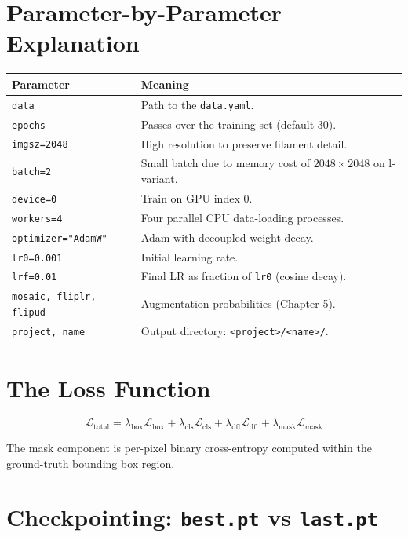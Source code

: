 \documentclass[11pt,a4paper,openany]{report}
\begin{document}
\section{Parameter-by-Parameter Explanation}

\begin{center}
\renewcommand{\arraystretch}{1.3}
\begin{tabular}{l p{9cm}}
\toprule
\textbf{Parameter} & \textbf{Meaning} \\
\midrule
\texttt{data} & Path to the \texttt{data.yaml}. \\
\texttt{epochs} & Passes over the training set (default 30). \\
\texttt{imgsz=2048} & High resolution to preserve filament detail. \\
\texttt{batch=2} & Small batch due to memory cost of $2048\times2048$ on l-variant. \\
\texttt{device=0} & Train on GPU index 0. \\
\texttt{workers=4} & Four parallel CPU data-loading processes. \\
\texttt{optimizer="AdamW"} & Adam with decoupled weight decay. \\
\texttt{lr0=0.001} & Initial learning rate. \\
\texttt{lrf=0.01} & Final LR as fraction of \texttt{lr0} (cosine decay). \\
\texttt{mosaic, fliplr, flipud} & Augmentation probabilities (Chapter 5). \\
\texttt{project, name} & Output directory: \texttt{<project>/<name>/}. \\
\bottomrule
\end{tabular}
\end{center}

\section{The Loss Function}

\[
  \mathcal{L}_\text{total} = \lambda_\text{box}\mathcal{L}_\text{box}
                            + \lambda_\text{cls}\mathcal{L}_\text{cls}
                            + \lambda_\text{dfl}\mathcal{L}_\text{dfl}
                            + \lambda_\text{mask}\mathcal{L}_\text{mask}
\]

The mask component is per-pixel binary cross-entropy computed within the ground-truth
bounding box region.

\section{Checkpointing: \texttt{best.pt} vs \texttt{last.pt}}
\end{document}
